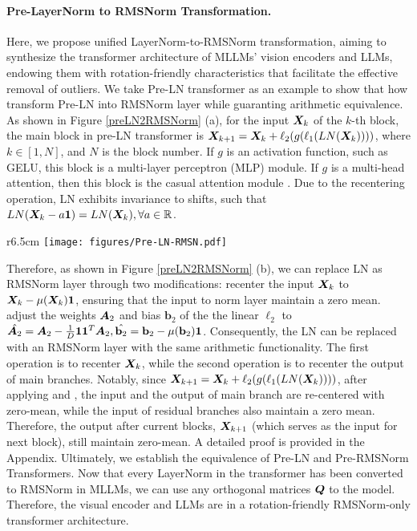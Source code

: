 \paragraph{Pre-LayerNorm to RMSNorm Transformation.} Here, we propose unified LayerNorm-to-RMSNorm transformation, aiming to synthesize the transformer architecture of MLLMs' vision encoders and LLMs, endowing them with rotation-friendly characteristics that facilitate the effective removal of outliers. We take Pre-LN transformer as an example to show that how transform Pre-LN into RMSNorm layer while guaranting arithmetic equivalence. As shown in Figure \ref{preLN2RMSNorm} (a), for the input $\boldsymbol{X}_k$ of the $k$-th block, the main block in pre-LN transformer is $\boldsymbol{X}_{k+1} = \boldsymbol{X}_k + \ell_2(g(\ell_1(LN(\boldsymbol{X}_k))))$, where $k \in [1, N]$, and $N$ is the block number. If $g$ is an activation function, such as GELU, this block is a multi-layer perceptron (MLP) module. If $g$ is a multi-head attention, then this block is the casual attention module \citep{vaswani2017attention}. Due to the recentering operation, LN exhibits invariance to shifts, such that $LN(\boldsymbol{X}_k - a\mathbf{1}) = LN(\boldsymbol{X}_k), \forall a \in \mathbb{R}$. 
\begin{wrapfigure}{r}{6.5cm}
    \texttt{[image: figures/Pre-LN-RMSN.pdf]}
    \caption{The illustration of transformation from Pre-LN to RMSNorm.}
  \label{preLN2RMSNorm}
  \vspace{-4mm}
\end{wrapfigure} Therefore, as shown in Figure \ref{preLN2RMSNorm} (b), we can replace LN as RMSNorm layer through two modifications: \raisebox{-0.5pt}{\ding[1.1]{182\relax}} recenter the input $\boldsymbol{X}_k$ to $\boldsymbol{X}_k - \mu(\boldsymbol{X}_k)\mathbf{1}$, ensuring that the input to norm layer maintain a zero mean. \raisebox{-0.5pt}{\ding[1.1]{183\relax}} adjust the weights $\boldsymbol{A}_2$ and bias $\mathbf{b}_2$ of the the linear $\ell_2$ to $\hat{\boldsymbol{A}_2} = \boldsymbol{A}_2 - \frac{1}{D}\mathbf{1} \mathbf{1}^T \boldsymbol{A}_2, \hat{\mathbf{b}_2} = \mathbf{b}_2 - \mu(\mathbf{b}_2)\mathbf{1}$. Consequently, the LN can be replaced with an RMSNorm layer with the same arithmetic functionality. The first operation is to recenter $\boldsymbol{X}_{k}$, while the second operation is to recenter the output of main branches. Notably, since $\boldsymbol{X}_{k+1} = \boldsymbol{X}_k + \ell_2(g(\ell_1(LN(\boldsymbol{X}_k))))$, after applying \raisebox{-0.5pt}{\ding[1.1]{182\relax}} and \raisebox{-0.5pt}{\ding[1.1]{183\relax}}, the input and the output of main branch are re-centered with zero-mean, while the input of residual branches also maintain a zero mean. Therefore, the output after current blocks, $\boldsymbol{X}_{k+1}$ (which serves as the input for next block), still maintain zero-mean. A detailed proof is provided in the Appendix. Ultimately, we establish the equivalence of Pre-LN and Pre-RMSNorm Transformers. Now that every LayerNorm in the transformer has been converted to RMSNorm in MLLMs, we can use any orthogonal matrices $\boldsymbol{Q}$ to the model. Therefore, the visual encoder and LLMs are in a rotation-friendly RMSNorm-only transformer architecture.
